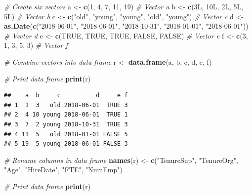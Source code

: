 \documentclass[]{book}
\newenvironment{Shaded}{\begin{snugshade}}{\end{snugshade}}
\newcommand{\KeywordTok}[1]{\textcolor[rgb]{0.13,0.29,0.53}{\textbf{#1}}}
\newcommand{\DecValTok}[1]{\textcolor[rgb]{0.00,0.00,0.81}{#1}}
\newcommand{\StringTok}[1]{\textcolor[rgb]{0.31,0.60,0.02}{#1}}
\newcommand{\CommentTok}[1]{\textcolor[rgb]{0.56,0.35,0.01}{\textit{#1}}}
\newcommand{\OtherTok}[1]{\textcolor[rgb]{0.56,0.35,0.01}{#1}}
\newcommand{\NormalTok}[1]{#1}
\begin{document}
\begin{Shaded}
\begin{Highlighting}[]
\CommentTok{# Create six vectors }
\NormalTok{a <-}\StringTok{ }\KeywordTok{c}\NormalTok{(}\DecValTok{1}\NormalTok{, }\DecValTok{4}\NormalTok{, }\DecValTok{7}\NormalTok{, }\DecValTok{11}\NormalTok{, }\DecValTok{19}\NormalTok{) }\CommentTok{# Vector a}
\NormalTok{b <-}\StringTok{ }\KeywordTok{c}\NormalTok{(3L, 10L, 2L, 5L, 5L) }\CommentTok{# Vector b}
\NormalTok{c <-}\StringTok{ }\KeywordTok{c}\NormalTok{(}\StringTok{"old"}\NormalTok{, }\StringTok{"young"}\NormalTok{, }\StringTok{"young"}\NormalTok{, }\StringTok{"old"}\NormalTok{, }\StringTok{"young"}\NormalTok{) }\CommentTok{# Vector c}
\NormalTok{d <-}\StringTok{ }\KeywordTok{as.Date}\NormalTok{(}\KeywordTok{c}\NormalTok{(}\StringTok{"2018-06-01"}\NormalTok{, }\StringTok{"2018-06-01"}\NormalTok{, }\StringTok{"2018-10-31"}\NormalTok{, }\StringTok{"2018-01-01"}\NormalTok{, }\StringTok{"2018-06-01"}\NormalTok{)) }\CommentTok{# Vector d}
\NormalTok{e <-}\StringTok{ }\KeywordTok{c}\NormalTok{(}\OtherTok{TRUE}\NormalTok{, }\OtherTok{TRUE}\NormalTok{, }\OtherTok{TRUE}\NormalTok{, }\OtherTok{FALSE}\NormalTok{, }\OtherTok{FALSE}\NormalTok{) }\CommentTok{# Vector e}
\NormalTok{f <-}\StringTok{ }\KeywordTok{c}\NormalTok{(}\DecValTok{3}\NormalTok{, }\DecValTok{1}\NormalTok{, }\DecValTok{3}\NormalTok{, }\DecValTok{5}\NormalTok{, }\DecValTok{3}\NormalTok{) }\CommentTok{# Vector f}

\CommentTok{# Combine vectors into data frame}
\NormalTok{r <-}\StringTok{ }\KeywordTok{data.frame}\NormalTok{(a, b, c, d, e, f)}

\CommentTok{# Print data frame}
\KeywordTok{print}\NormalTok{(r)}
\end{Highlighting}
\end{Shaded}

\begin{verbatim}
##    a  b     c          d     e f
## 1  1  3   old 2018-06-01  TRUE 3
## 2  4 10 young 2018-06-01  TRUE 1
## 3  7  2 young 2018-10-31  TRUE 3
## 4 11  5   old 2018-01-01 FALSE 5
## 5 19  5 young 2018-06-01 FALSE 3
\end{verbatim}

\begin{Shaded}
\begin{Highlighting}[]
\CommentTok{# Rename columns in data frame}
\KeywordTok{names}\NormalTok{(r) <-}\StringTok{ }\KeywordTok{c}\NormalTok{(}\StringTok{"TenureSup"}\NormalTok{, }\StringTok{"TenureOrg"}\NormalTok{, }\StringTok{"Age"}\NormalTok{, }\StringTok{"HireDate"}\NormalTok{, }\StringTok{"FTE"}\NormalTok{, }\StringTok{"NumEmp"}\NormalTok{)}

\CommentTok{# Print data frame}
\KeywordTok{print}\NormalTok{(r)}
\end{Highlighting}
\end{Shaded}
\end{document}
